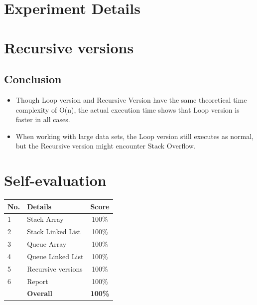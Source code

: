 \documentclass[a4paper, 12pt]{article}
\begin{document}
\tableofcontents\thispagestyle{empty}

\pagebreak
\section{Experiment Details}



\pagebreak
\section{Recursive versions}



\subsection{Conclusion}
\begin{itemize}
  \item Though Loop version and Recursive Version have the same theoretical time complexity of O(n), the actual execution time shows that Loop version is faster in all cases.
  \item When working with large data sets, the Loop version still executes as normal, but the Recursive version might encounter Stack Overflow.
\end{itemize}

\pagebreak
\section{Self-evaluation}
\begin{center}
  \renewcommand{\arraystretch}{1.5}
  \begin{tabular}{|l|p{}|c|}
    \hline
    \textbf{No.} & \textbf{Details}   & \textbf{Score} \\ \hline
    1            & Stack Array        & 100\%          \\ \hline
    2            & Stack Linked List  & 100\%          \\ \hline
    3            & Queue Array        & 100\%          \\ \hline
    4            & Queue Linked List  & 100\%          \\ \hline
    5            & Recursive versions & 100\%          \\ \hline
    6            & Report             & 100\%          \\ \hline
                 & \textbf{Overall}   & \textbf{100\%} \\ \hline
  \end{tabular}
\end{center}
\end{document}
